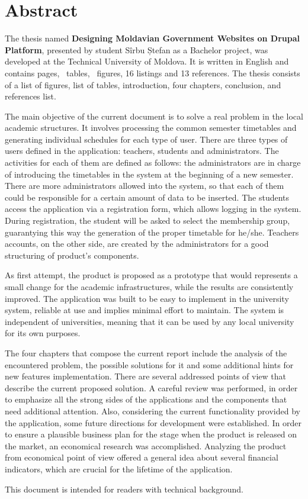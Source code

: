 \section*{Abstract}
The thesis named \textbf{Designing Moldavian Government Websites on Drupal Platform}, presented by student Sîrbu Ștefan as a Bachelor project, was developed at the Technical University of Moldova. It is written in English and contains \pageref{LastPage} pages, \totaltables\ tables, \totalfigures\ figures, 16 listings and 13 references. The thesis consists of a list of figures, list of tables, introduction, four chapters, conclusion, and references list.

The main objective of the current document is to solve a real problem in the local academic structures. It involves processing the common semester timetables and generating individual schedules for each type of user.  There are three types of users defined in the application: teachers, students and administrators. The activities for each of them are defined as follows: the administrators are in charge of introducing the timetables in the system at the beginning of a new semester. There are more administrators allowed into the system, so that each of them could be responsible for a certain amount of data to be inserted. The students access the application via a registration form, which allows logging in the system. During registration, the student will be asked to select the membership group, guarantying this way the generation of the proper timetable for he/she. Teachers accounts, on the other side, are created by the administrators for a good structuring of product's components.

As first attempt, the product is proposed as a prototype that would represents a small change for the academic infrastructures, while the results are consistently improved. The application was built to be easy to implement in the university system, reliable at use and implies minimal effort to maintain. The system is independent of universities, meaning that it can be used by any local university for its own purposes.

The four chapters that compose the current report include the analysis of the encountered problem, the possible solutions for it and some additional hints for new features implementation. There are several addressed points of view that describe the current proposed solution. A careful review was performed, in order to emphasize all the strong sides of the applications and the components that need additional attention. Also, considering the current functionality provided by the application, some future directions for development were established. In order to ensure a plausible business plan for the stage when the product is released on the market, an economical research was accomplished. Analyzing the product from economical point of view offered a general idea about several financial indicators, which are crucial for the lifetime of the application.

This document is intended for readers with technical background.


